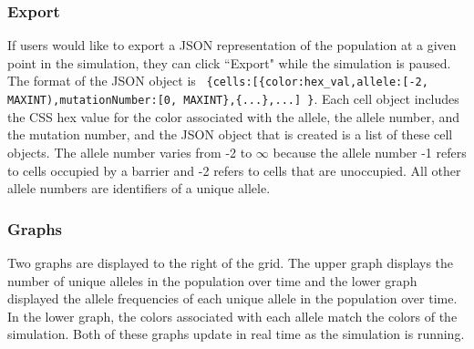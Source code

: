 \documentclass[12pt]{article}
\begin{document}
\begin{spacing}{1.6}
\subsubsection{Export}
If users would like to export a JSON representation of the population at a given point in the simulation, they can click ``Export" while the simulation is paused. The format of the JSON object is \ \texttt{\{cells:[\{color:hex\_val,allele:[-2, MAXINT),mutationNumber:[0, MAXINT\},\{...\},...] \}}. Each cell object includes the CSS hex value for the color associated with the allele, the allele number, and the mutation number, and the JSON object that is created is a list of these cell objects. The allele number varies from -2 to $\infty$ because the allele number -1 refers to cells occupied by a barrier and -2 refers to cells that are unoccupied. All other allele numbers are identifiers of a unique allele.

\subsubsection{Graphs}
Two graphs are displayed to the right of the grid. The upper graph displays the number of unique alleles in the population over time and the lower graph displayed the allele frequencies of each unique allele in the population over time. In the lower graph, the colors associated with each allele match the colors of the simulation. Both of these graphs update in real time as the simulation is running.


\end{spacing}
\end{document}
